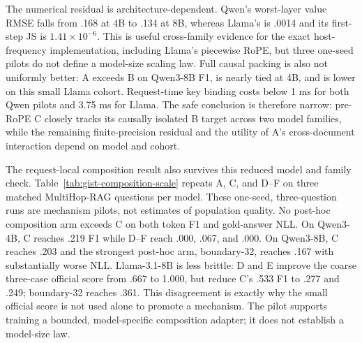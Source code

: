 \documentclass[11pt]{article}
\begin{document}
\begin{table}[ht]
\centering
\caption{Pre-RoPE reduced scale and family check. A/B/C denote full packed,
document-isolated packed, and independently encoded pre-RoPE records at exact
packed positions. Only Qwen3-1.7B uses five independent seed cohorts.}
\label{tab:prerope-scale}
\small
\resizebox{\linewidth}{!}{}
\end{table}

The numerical residual is architecture-dependent. Qwen's worst-layer value
RMSE falls from .168 at 4B to .134 at 8B, whereas Llama's is .0014 and its
first-step JS is $1.41\times10^{-6}$. This is useful cross-family evidence for
the exact host-frequency implementation, including Llama's piecewise RoPE, but
three one-seed pilots do not define a model-size scaling law. Full causal
packing is also not uniformly better: A exceeds B on Qwen3-8B F1, is nearly
tied at 4B, and is lower on this small Llama cohort. Request-time key binding
costs below 1 ms for both Qwen pilots and 3.75 ms for Llama. The safe conclusion
is therefore narrow: pre-RoPE C closely tracks its causally isolated B target
across two model families, while the remaining finite-precision residual and
the utility of A's cross-document interaction depend on model and cohort.

The request-local composition result also survives this reduced model and
family check. Table~\ref{tab:gist-composition-scale} repeats A, C, and D--F on
three matched MultiHop-RAG questions per model. These one-seed, three-question
runs are mechanism pilots, not estimates of population quality. No post-hoc
composition arm exceeds C on both token F1 and gold-answer NLL. On Qwen3-4B,
C reaches .219 F1 while D--F reach .000, .067, and .000. On Qwen3-8B, C
reaches .203 and the strongest post-hoc arm, boundary-32, reaches .167 with
substantially worse NLL. Llama-3.1-8B is less brittle: D and E improve the
coarse three-case official score from .667 to 1.000, but reduce C's .533 F1 to
.277 and .249; boundary-32 reaches .361. This disagreement is exactly why the
small official score is not used alone to promote a mechanism. The pilot
supports training a bounded, model-specific composition adapter; it does not
establish a model-size law.

\begin{table}[ht]
\centering
\caption{Reduced request-local composition pilots on three matched questions
per model. All checkpoints use 4-bit weights. C is independently encoded
pre-RoPE K/V; D--F are untrained post-hoc composition mechanisms.}
\label{tab:gist-composition-scale}
\small
\resizebox{\linewidth}{!}{}
\end{table}
\end{document}
